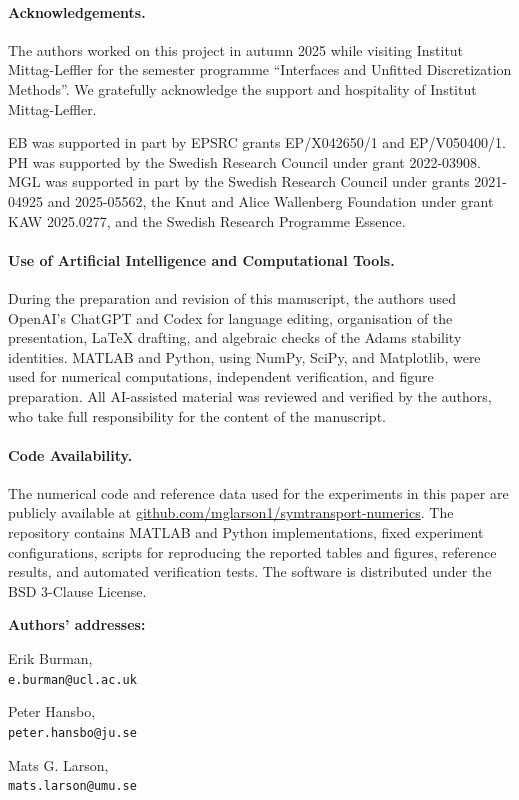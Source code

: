 \documentclass[11pt]{article}
\begin{document}
\bigskip

\paragraph{Acknowledgements.}
The authors worked on this project in autumn 2025 while visiting Institut
Mittag-Leffler for the semester programme ``Interfaces and Unfitted
Discretization Methods''. We gratefully acknowledge the support and hospitality
of Institut Mittag-Leffler.

EB was supported in part by EPSRC grants EP/X042650/1 and EP/V050400/1. PH was
supported by the Swedish Research Council under grant 2022-03908. MGL was
supported in part by the Swedish Research Council under grants 2021-04925 and
2025-05562, the Knut and Alice Wallenberg Foundation under grant KAW
2025.0277, and the Swedish Research Programme Essence.

\paragraph{Use of Artificial Intelligence and Computational Tools.}
During the preparation and revision of this manuscript, the authors used
OpenAI's ChatGPT and Codex for language editing, organisation of the
presentation, LaTeX drafting, and algebraic checks of the Adams stability
identities. MATLAB and Python, using NumPy, SciPy, and Matplotlib, were used for
numerical computations, independent verification, and figure preparation. All
AI-assisted material was reviewed and verified by the authors, who take full
responsibility for the content of the manuscript.

\paragraph{Code Availability.}
The numerical code and reference data used for the experiments in this paper
are publicly available at
\url{github.com/mglarson1/symtransport-numerics}. The repository
contains MATLAB and Python implementations, fixed experiment configurations,
scripts for reproducing the reported tables and figures, reference results,
and automated verification tests. The software is distributed under the BSD
3-Clause License.

\bigskip
\bigskip
\noindent
\footnotesize {\bf Authors' addresses:}

\smallskip
\noindent
Erik Burman, \quad \hfill \addressuclshort\\
{\tt e.burman@ucl.ac.uk}

\smallskip
\noindent
Peter Hansbo, \quad \hfill \addressjushort\\
{\tt peter.hansbo@ju.se}

\smallskip
\noindent
Mats G. Larson, \quad \hfill \addressumushort\\
{\tt mats.larson@umu.se}




\end{document}

